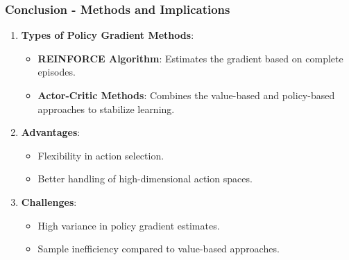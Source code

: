 \documentclass[aspectratio=169]{beamer}
\begin{document}
\begin{frame}[fragile]
    \frametitle{Conclusion - Methods and Implications}
    \begin{enumerate}[resume]
        \item \textbf{Types of Policy Gradient Methods}:
        \begin{itemize}
            \item \textbf{REINFORCE Algorithm}: Estimates the gradient based on complete episodes.
            \item \textbf{Actor-Critic Methods}: Combines the value-based and policy-based approaches to stabilize learning.
        \end{itemize}

        \item \textbf{Advantages}:
        \begin{itemize}
            \item Flexibility in action selection.
            \item Better handling of high-dimensional action spaces.
        \end{itemize}

        \item \textbf{Challenges}:
        \begin{itemize}
            \item High variance in policy gradient estimates.
            \item Sample inefficiency compared to value-based approaches.
        \end{itemize}
    \end{enumerate}
\end{frame}
\end{document}
